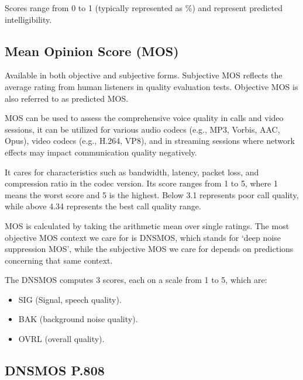 Scores range from 0 to 1 (typically represented as \%) and represent predicted intelligibility.

\subsection{Mean Opinion Score (MOS)}
Available in both objective and subjective forms. Subjective MOS reflects the average rating from human listeners in quality evaluation tests. Objective MOS is also referred to as predicted MOS.

MOS can be used to assess the comprehensive voice quality in calls and video sessions, it can be utilized for various audio codecs (e.g., MP3, Vorbis, AAC, Opus), video codecs (e.g., H.264, VP8), and in streaming sessions where network effects may impact communication quality negatively.

It cares for characteristics such as bandwidth, latency, packet loss, and compression ratio in the codec version. Its score ranges from 1 to 5, where 1 means the worst score and 5 is the highest. Below 3.1 represents poor call quality, while above 4.34 represents the best call quality range.

MOS is calculated by taking the arithmetic mean over single ratings. The most objective MOS context we care for is DNSMOS, which stands for ‘deep noise suppression MOS’, while the subjective MOS we care for depends on predictions concerning that same context.

The DNSMOS computes 3 scores, each on a scale from 1 to 5, which are:

\begin{itemize}
    \item SIG (Signal, speech quality).
    \item BAK (background noise quality).
    \item OVRL (overall quality).
\end{itemize}

\subsection{DNSMOS P.808 \cite{reddy2021dnsmosnonintrusiveperceptualobjective}}

